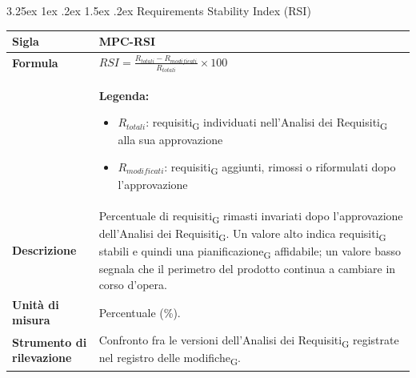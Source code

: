 \documentclass[a4paper, 10pt]{article}
\makeatletter
\renewcommand\paragraph{\@startsection{paragraph}{4}{\z@}%
  {3.25ex \@plus1ex \@minus .2ex}%
  {1.5ex \@plus .2ex}%
  {\normalfont\normalsize\bfseries}}
\makeatother
\begin{document}
\paragraph{Requirements Stability Index (RSI)}
\mbox{} \\
\noindent
\begin{minipage}{\textwidth}
    \begin{tabularx}{\textwidth}{|>{\columncolor{bluBitless!10}\bfseries}p{3.5cm}|X|}
        \hline
        Sigla & MPC-RSI \\ \hline
        Formula &
        \textit{$RSI = \frac{R_{totali} - R_{modificati}}{R_{totali}} \times 100$} \vspace{2mm} \\
        & \small \textbf{Legenda:}
        \begin{itemize}
            \item $R_{totali}$: requisiti\textsubscript{G} individuati nell'Analisi dei Requisiti\textsubscript{G} alla sua approvazione
            \item $R_{modificati}$: requisiti\textsubscript{G} aggiunti, rimossi o riformulati dopo l'approvazione
        \end{itemize} \\ \hline
        Descrizione & Percentuale di requisiti\textsubscript{G} rimasti invariati dopo l'approvazione dell'Analisi dei Requisiti\textsubscript{G}. Un valore alto indica requisiti\textsubscript{G} stabili e quindi una pianificazione\textsubscript{G} affidabile; un valore basso segnala che il perimetro del prodotto continua a cambiare in corso d'opera. \\ \hline
        Unità di misura & Percentuale (\%). \\ \hline
        Strumento di rilevazione & Confronto fra le versioni dell'Analisi dei Requisiti\textsubscript{G} registrate nel registro delle modifiche\textsubscript{G}. \\ \hline
    \end{tabularx}
\end{minipage}

\vspace{1cm}

\end{document}
